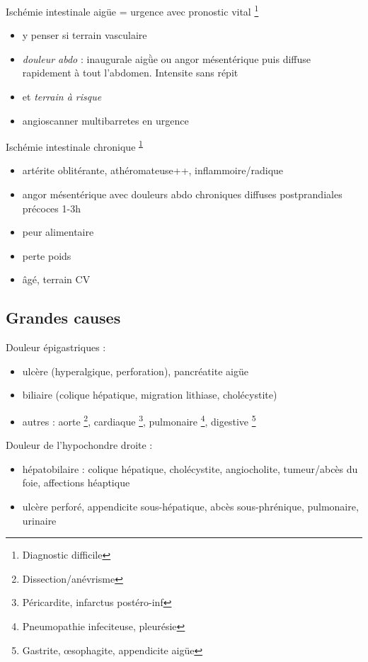 \documentclass[11pt]{article}
\begin{document}
Ischémie intestinale aigüe = urgence avec pronostic vital  \footnote{Diagnostic difficile\label{org2da56b0}}
\begin{itemize}
\item y penser si terrain vasculaire
\item \emph{douleur abdo} : inaugurale aigǜe ou angor mésentérique puis diffuse rapidement
à tout l'abdomen. Intensite \inc{} sans répit
\item et \emph{terrain à risque}
\item angioscanner multibarretes en urgence
\end{itemize}
Ischémie intestinale chronique \textsuperscript{\ref{org2da56b0}}
\begin{itemize}
\item artérite oblitérante, athéromateuse++, inflammoire/radique
\item angor mésentérique avec douleurs abdo chroniques diffuses postprandiales
précoces 1-3h
\item peur alimentaire
\item perte poids
\item âgé, terrain CV
\end{itemize}

\subsection{Grandes causes}
\label{sec:org9868973}
Douleur épigastriques : 
\begin{itemize}
\item ulcère (hyperalgique, perforation), pancréatite aigüe
\item biliaire (colique hépatique, migration lithiase, cholécystite)
\item autres : aorte \footnote{Dissection/anévrisme}, cardiaque \footnote{Péricardite, infarctus postéro-inf}, pulmonaire \footnote{Pneumopathie infeciteuse, pleurésie}, digestive \footnote{Gastrite, \oe{}sophagite, appendicite aigüe}
\end{itemize}

Douleur de l'hypochondre droite :
\begin{itemize}
\item hépatobilaire : colique hépatique, cholécystite, angiocholite, tumeur/abcès du
foie, affections héaptique
\item ulcère perforé, appendicite sous-hépatique, abcès sous-phrénique,
pulmonaire, urinaire
\end{itemize}
\end{document}
